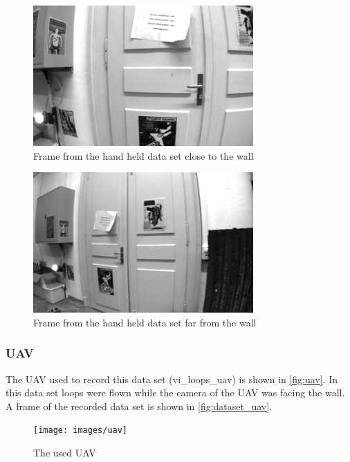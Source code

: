 \begin{figure}[H]
  \centering
  \includegraphics[width=0.75\textwidth]{images/frame0000}
  \caption{Frame from the hand held data set close to the wall}
  \label{fig:dataset_close}
\end{figure}

\begin{figure}[H]
  \centering
  \includegraphics[width=0.75\textwidth]{images/frame0014}
  \caption{Frame from the hand held data set far from the wall}
  \label{fig:dataset_far}
\end{figure}

\subsubsection{\acf{UAV}}
The \ac{UAV} used to record this data set (vi\_loops\_uav) is shown in \autoref{fig:uav}. In this data set loops were flown while the camera of the \ac{UAV} was facing the wall. A frame of the recorded data set is shown in \autoref{fig:dataset_uav}.

\begin{figure}[H]
  \centering
  \texttt{[image: images/uav]}
  \caption{The used \ac{UAV}}
  \label{fig:uav}
\end{figure}

